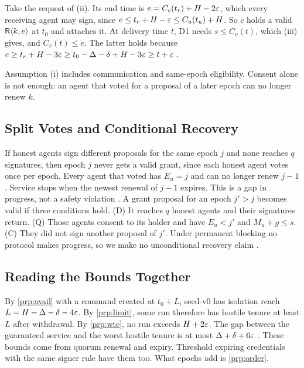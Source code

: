\begin{argument}
Take the request of (ii). Its end time is $e = C_c(t_r) + H - 2\varepsilon$, which every
receiving agent may sign, since $e \le t_r + H - \varepsilon \le C_u(t_u) + H$. So $c$ holds a
valid $\mathsf{R}\langle k, e\rangle$ at $t_0$ and attaches it. At delivery time $t$, D1 needs
$s \le C_v(t)$, which (iii) gives, and $C_v(t) \le e$. The latter holds because
$e \ge t_r + H - 3\varepsilon \ge t_0 - \Delta - \delta + H - 3\varepsilon \ge t + \varepsilon$
.
\end{argument}

Assumption (i) includes communication and same-epoch eligibility. Consent alone is not
enough: an agent that voted for a proposal of a later epoch can no longer renew $k$.

\subsection{Split Votes and Conditional Recovery}
\label{sec:split}

If honest agents sign different proposals for the same epoch $j$ and none reaches $q$
signatures, then epoch $j$ never gets a valid grant, since each honest agent votes once
per epoch. Every agent that voted has $E_u = j$ and can no longer renew $j - 1$. Service
stops when the newest renewal of $j - 1$ expires. This is a gap in progress, not a safety
violation . A grant proposal for an epoch $j' > j$ becomes valid if three
conditions hold. (D) It reaches $q$ honest agents and their signatures return. (Q) Those
agents consent to its holder and have $E_u < j'$ and $M_u + g \le s$. (C) They did not
sign another proposal of $j'$. Under permanent blocking no protocol makes progress, so we
make no unconditional recovery claim .

\subsection{Reading the Bounds Together}

By \cref{prp:avail} with a command created at $t_0 + L$, seed-v0 has isolation reach
$L = H - \Delta - \delta - 4\varepsilon$. By \cref{prp:limit}, some run therefore has hostile
tenure at least $L$ after withdrawal. By \cref{prp:wte}, no run exceeds $H + 2\varepsilon$. The
gap between the guaranteed service and the worst hostile tenure is at most
$\Delta + \delta + 6\varepsilon$ . These bounds come from quorum renewal and expiry. Threshold
expiring credentials with the same signer rule have them too. What epochs add is
\cref{prp:order}.

